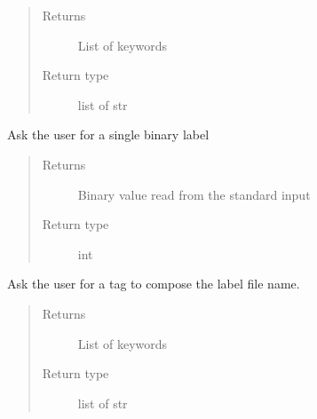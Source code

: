 \documentclass[letterpaper,10pt,english]{sphinxmanual}
\begin{document}
\begin{fulllineitems}
\begin{fulllineitems}
\begin{quote}
\begin{description}
\item[{Returns}] \leavevmode
\sphinxAtStartPar
{} \textendash{} List of keywords

\item[{Return type}] \leavevmode
\sphinxAtStartPar
list of str

\end{description}\end{quote}

\end{fulllineitems}


\begin{fulllineitems}
\label{\detokenize{dc_query_manager:src.query_manager.QueryManager.ask_label}}
\sphinxAtStartPar
Ask the user for a single binary label
\begin{quote}\begin{description}
\item[{Returns}] \leavevmode
\sphinxAtStartPar
{} \textendash{} Binary value read from the standard input

\item[{Return type}] \leavevmode
\sphinxAtStartPar
int

\end{description}\end{quote}

\end{fulllineitems}


\begin{fulllineitems}
\label{\detokenize{dc_query_manager:src.query_manager.QueryManager.ask_label_tag}}
\sphinxAtStartPar
Ask the user for a tag to compose the label file name.
\begin{quote}\begin{description}
\item[{Returns}] \leavevmode
\sphinxAtStartPar
{} \textendash{} List of keywords

\item[{Return type}] \leavevmode
\sphinxAtStartPar
list of str


\end{description}
\end{quote}
\end{fulllineitems}
\end{fulllineitems}
\end{document}
